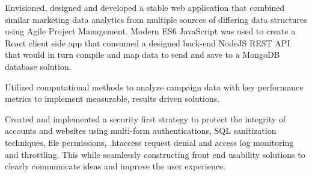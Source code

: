 \documentclass[letterpaper]{deedy-resume} %
\begin{document}
\begin{minipage}[t]{0.66\textwidth}
\begin{tightitemize}
\end{tightitemize}




\vspace{\topsep} %

\begin{tightitemize}
\item Envisioned, designed and developed a stable web application that combined similar marketing data analytics from multiple sources of differing data structures using Agile Project Management. Modern ES6 JavaScript was used to create a React client side app that consumed a designed back-end NodeJS REST API that would in turn compile and map data to send and save to a MongoDB database solution.
\vspace{\topsep}
\item Utilized computational methods to analyze campaign data with key performance metrics to implement measurable, results driven solutions.
\vspace{\topsep} %
\item Created and implemented a security first strategy to protect the integrity of accounts and websites using multi-form authentications, SQL sanitization techniques, file permissions, .htaccess request denial and access log monitoring and throttling. This while seamlessly constructing front end usability solutions to clearly communicate ideas and improve the user experience.


\end{tightitemize}
\end{minipage}
\end{document}
